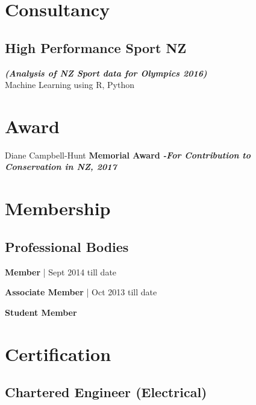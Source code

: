 \documentclass[letterpaper]{tap-resume}
\begin{document}
\begin{minipage}[t]{0.3333\textwidth}
\sectionspace 

\section{Consultancy}

\subsection{High Performance Sport NZ}
\footnotesize \textit{\textbf{(Analysis of NZ Sport data for Olympics 2016)}}\\
\textbullet Machine Learning using R, Python \\


\sectionspace 

\section{Award}

Diane Campbell-Hunt \textbf{Memorial Award}
{\footnotesize \textit{\textbf{-For Contribution to Conservation in NZ, 2017}}}
\sectionspace 



\section{Membership} 
\subsection{Professional Bodies}
\sectionspace
\textbf{Member} | Sept 2014 till date

\textbf{Associate Member} | Oct 2013 till date


\textbf{Student Member}

\sectionspace

\section{Certification}

\subsection{Chartered Engineer \scriptsize{(Electrical)}}


\end{minipage}
\end{document}
